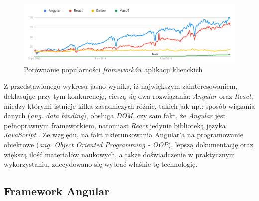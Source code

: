 \begin{figure}[ht]
	\centering
	\includegraphics[width=1\linewidth]{graphics/chapter-3/frontend-frameworks.png}
	\caption{Porównanie popularności \textit{frameworków} aplikacji klienckich \cite{google-trends}}
	\label{fig:frontend-frameworks}
\end{figure}
\noindent Z przedstawionego wykresu jasno wynika, iż największym zainteresowaniem, deklasując przy tym konkurencję, cieszą się dwa rozwiązania: \textit{Angular} oraz \textit{React}, między którymi istnieje kilka zasadniczych różnic, takich jak np.: sposób wiązania danych (\textit{ang. data binding}), obsługa \textit{DOM}, czy sam fakt, że \textit{Angular} jest pełnoprawnym frameworkiem, natomiast \textit{React} jedynie biblioteką języka \textit{JavaScript} \cite{angular-react-comparison}. Ze względu, na fakt ukierunkowania Angular'a na programowanie obiektowe (\textit{ang. Object Oriented Programming - OOP}), lepszą dokumentację oraz większą ilość materiałów naukowych, a także doświadczenie w praktycznym wykorzystaniu, zdecydowano się wybrać właśnie tę technologię.



\subsection{Framework Angular}

